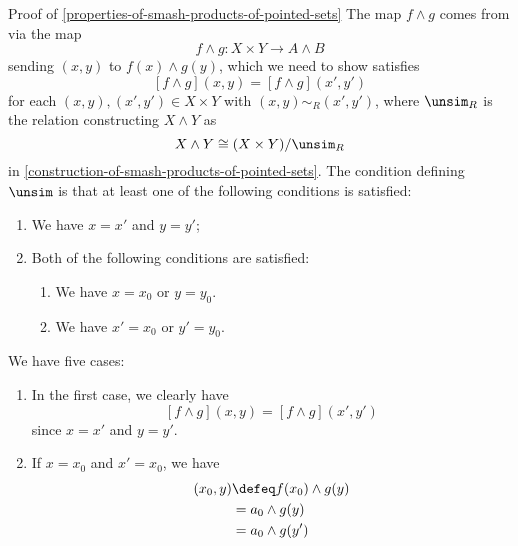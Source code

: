 \begin{Proof}{Proof of \cref{properties-of-smash-products-of-pointed-sets}}%
    The map $f\wedge g$ comes from  via the map
    \[
        f\wedge g%
        \colon%
        X\times Y%
        \to%
        A\wedge B%
    \]%
    sending $(x,y)$ to $f(x)\wedge g(y)$, which we need to show satisfies
    \[
        [f\wedge g](x,y)%
        =%
        [f\wedge g](x',y')%
    \]%
    for each $(x,y),(x',y')\in X\times Y$ with $(x,y)\sim_{R}(x',y')$, where $\unsim_{R}$ is the relation constructing $X\wedge Y$ as
    \[
        X\wedge Y%
        \cong%
        (X\times Y)/\unsim_{R}%
    \]%
    in \cref{construction-of-smash-products-of-pointed-sets}. The condition defining $\unsim$ is that at least one of the following conditions is satisfied:
    \begin{enumerate}
        \item We have $x=x'$ and $y=y'$;
        \item Both of the following conditions are satisfied:
            \begin{enumerate}
                \item We have $x=x_{0}$ or $y=y_{0}$.
                \item We have $x'=x_{0}$ or $y'=y_{0}$.
            \end{enumerate}
    \end{enumerate}
    We have five cases:
    \begin{enumerate}
        \item In the first case, we clearly have
            \[
                [f\wedge g](x,y)%
                =%
                [f\wedge g](x',y')%
            \]%
            since $x=x'$ and $y=y'$.
        \item If $x=x_{0}$ and $x'=x_{0}$, we have 
            \begin{align*}
                [f\wedge g](x_{0},y) &\defeq f(x_{0})\wedge g(y)\\%
                                     &=      a_{0}\wedge g(y)\\%
                                     &=      a_{0}\wedge g(y')\\%

\end{align*}
\end{enumerate}
\end{Proof}

